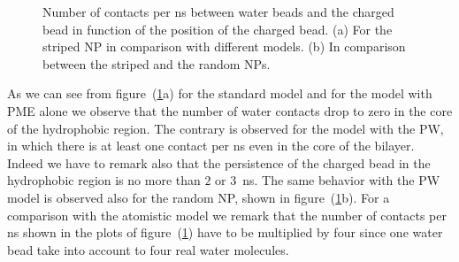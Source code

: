 \begin{figure}[!ht]
	\center
	\caption{Number of contacts per ns between water beads and the charged bead in function of the position of the charged bead. (a) For the striped \acs{NP} in comparison with different models. (b) In comparison between the striped and the random \acs{NP}s.}
	\label{fig:WContact}
\end{figure}

As we can see from figure~(\ref{fig:WContact}a) for the standard \martini model and for the model with \ac{PME} alone we observe that the number of water contacts drop to zero in the core of the hydrophobic region. The contrary is observed for the model with the \ac{PW}, in which there is at least one contact per ns even in the core of the bilayer. Indeed we have to remark also that the persistence of the charged bead in the hydrophobic region is no more than $2$ or $3$~ns. The same behavior with the \ac{PW} model is observed also for the random \ac{NP}, shown in figure~(\ref{fig:WContact}b). For a comparison with the atomistic model we remark that the number of contacts per ns shown in the plots of figure~(\ref{fig:WContact}) have to be multiplied by four since one \martini water bead take into account to four real water molecules.


